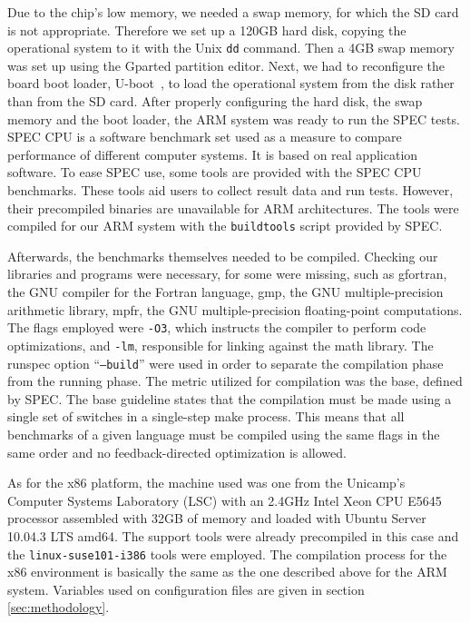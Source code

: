 \documentclass[11pt,twoside]{article}
\begin{document}
  Due to the chip's low memory, we needed a swap memory,
  for which the SD card is not appropriate. Therefore we set up
  a 120GB hard disk, copying the operational system to it
  with the Unix \texttt{dd} command. Then a 4GB swap memory
  was set up using the Gparted partition editor.
  Next, we had to reconfigure the board boot loader,
  U-boot~\cite{uboot}, to load the operational
  system from the disk rather than from the SD card. After
  properly configuring the hard disk, the swap memory and the
  boot loader, the ARM system was ready to run the SPEC tests.
  SPEC CPU is a software benchmark set used as a measure to compare 
  performance of different computer systems.
  It is based on real application software. To ease SPEC use,
  some tools are provided with the SPEC CPU benchmarks.
  These tools aid users to collect result data and run tests.
  However, their precompiled binaries are unavailable for ARM
  architectures. The tools were compiled for our ARM system
  with the \texttt{buildtools} script provided by SPEC.

  Afterwards, the benchmarks themselves needed to be compiled. 
  Checking our libraries and programs were necessary, for some
  were missing, such as gfortran, the GNU compiler for the 
  Fortran language, gmp, the GNU multiple-precision
  arithmetic library, mpfr, the GNU multiple-precision 
  floating-point computations. The flags employed were \texttt{-O3},
  which instructs the compiler to perform code optimizations, and
  \texttt{-lm}, responsible for
  linking against the math library. The runspec option 
  ``\texttt{--build}'' were used in order to separate the compilation
  phase from the running phase. The metric utilized for
  compilation was the base, defined by SPEC. The base guideline
  states that the compilation must be made using a single set of
  switches in a single-step make process. This means that all
  benchmarks of a given language must be compiled using the
  same flags in the same order and no feedback-directed
  optimization is allowed.
  
  As for the x86 platform, the machine used was one
  from the Unicamp's Computer Systems Laboratory (LSC)
  with an 2.4GHz Intel Xeon CPU E5645
  processor assembled with 32GB of memory and loaded with Ubuntu
  Server 10.04.3 LTS amd64. The support tools
  were already precompiled in this case and the 
  \texttt{linux-suse101-i386} tools were employed. The compilation
  process for the x86 environment is basically the same as the 
  one described above for the ARM system. Variables used on
  configuration files are given in section \ref{sec:methodology}.
\end{document}
